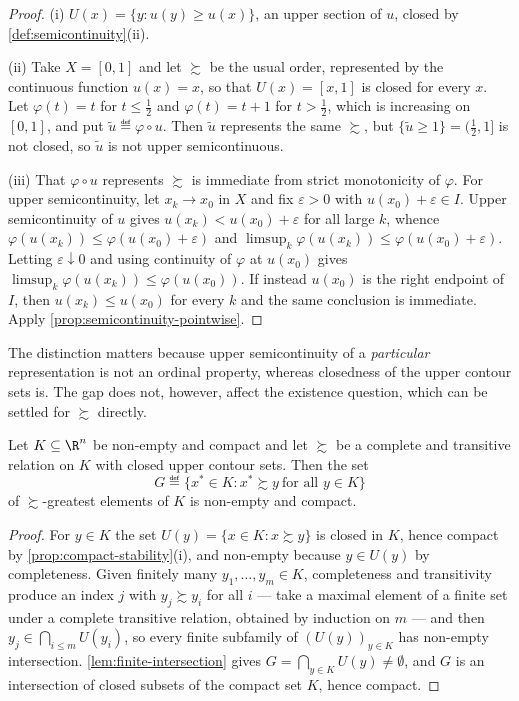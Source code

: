 \begin{proof}
	(i) $U(x)=\{y : u(y)\geq u(x)\}$, an upper section of $u$, closed by
	\autoref{def:semicontinuity}(ii).

	(ii) Take $X=[0,1]$ and let $\succsim$ be the usual order, represented by the
	continuous function $u(x)=x$, so that $U(x)=[x,1]$ is closed for every $x$. Let
	$\varphi(t)=t$ for $t\leq\tfrac12$ and $\varphi(t)=t+1$ for $t>\tfrac12$, which
	is increasing on $[0,1]$, and put $\tilde u\eqdef\varphi\circ u$. Then
	$\tilde u$ represents the same $\succsim$, but
	$\{\tilde u\geq1\}=(\tfrac12,1]$ is not closed, so $\tilde u$ is not upper
	semicontinuous.

	(iii) That $\varphi\circ u$ represents $\succsim$ is immediate from strict
	monotonicity of $\varphi$. For upper semicontinuity, let $x_k\to x_0$ in $X$
	and fix $\varepsilon>0$ with $u(x_0)+\varepsilon\in I$. Upper semicontinuity of
	$u$ gives $u(x_k)<u(x_0)+\varepsilon$ for all large $k$, whence
	$\varphi(u(x_k))\leq\varphi(u(x_0)+\varepsilon)$ and
	$\limsup_k\varphi(u(x_k))\leq\varphi(u(x_0)+\varepsilon)$. Letting
	$\varepsilon\downarrow0$ and using continuity of $\varphi$ at $u(x_0)$ gives
	$\limsup_k\varphi(u(x_k))\leq\varphi(u(x_0))$. If instead $u(x_0)$ is the right
	endpoint of $I$, then $u(x_k)\leq u(x_0)$ for every $k$ and the same conclusion
	is immediate. Apply
	\autoref{prop:semicontinuity-pointwise}.
\end{proof}

The distinction matters because upper semicontinuity of a \emph{particular}
representation is not an ordinal property, whereas closedness of the upper
contour sets is. The gap does not, however, affect the existence question, which
can be settled for $\succsim$ directly.

\begin{proposition}\label{prop:greatest-element}
	Let $K\subseteq\R^n$ be non-empty and compact and let $\succsim$ be a complete
	and transitive relation on $K$ with closed upper contour sets. Then the set
	\[
		G\eqdef\{x^\ast\in K : x^\ast\succsim y\ \text{for all }y\in K\}
	\]
	of $\succsim$-greatest elements of $K$ is non-empty and compact.
\end{proposition}

\begin{proof}
	For $y\in K$ the set $U(y)=\{x\in K : x\succsim y\}$ is closed in $K$, hence
	compact by \autoref{prop:compact-stability}(i), and non-empty because
	$y\in U(y)$ by completeness. Given finitely many $y_1,\dots,y_m\in K$,
	completeness and transitivity produce an index $j$ with $y_j\succsim y_i$ for
	all $i$ --- take a maximal element of a finite set under a complete transitive
	relation, obtained by induction on $m$ --- and then
	$y_j\in\bigcap_{i\leq m}U(y_i)$, so every finite subfamily of $(U(y))_{y\in K}$
	has non-empty intersection. \autoref{lem:finite-intersection} gives
	$G=\bigcap_{y\in K}U(y)\neq\emptyset$, and $G$ is an intersection of closed
	subsets of the compact set $K$, hence compact.
\end{proof}

